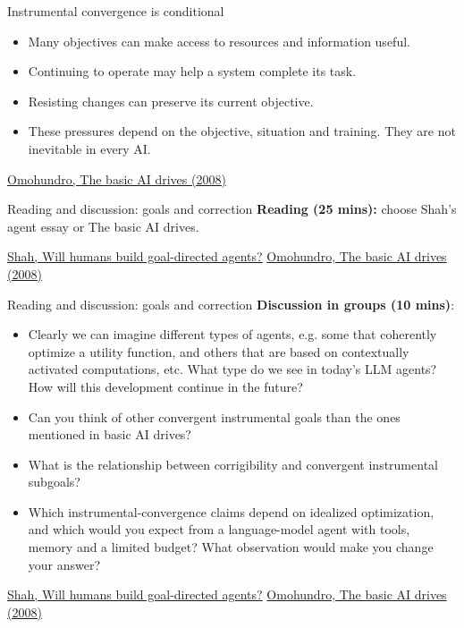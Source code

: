 \documentclass[aspectratio=169,11pt]{beamer}
\newcommand{\sources}[1]{\vfill{\fontsize{6.3}{7.5}\selectfont\color{muted}#1\par}}
\begin{document}
\begin{frame}[t,label=convergence]{Instrumental convergence is conditional}
\begin{itemize}\setlength{\itemsep}{3.5mm}
\item Many objectives can make access to resources and information useful.
\item Continuing to operate may help a system complete its task.
\item Resisting changes can preserve its current objective.
\item These pressures depend on the objective, situation and training. They are not inevitable in every AI.
\end{itemize}
\sources{\href{https://selfawaresystems.com/wp-content/uploads/2008/01/ai_drives_final.pdf}{Omohundro, The basic AI drives (2008)}}
\end{frame}

\begin{frame}[t,label=agencyexercise]{Reading and discussion: goals and correction}
\textbf{Reading (25 mins):} choose Shah's agent essay or The basic AI drives.
\sources{\href{https://www.alignmentforum.org/posts/9zpT9dikrrebdq3Jf/will-humans-build-goal-directed-agents}{Shah, Will humans build goal-directed agents?} \quad \href{https://selfawaresystems.com/wp-content/uploads/2008/01/ai_drives_final.pdf}{Omohundro, The basic AI drives (2008)}}
\end{frame}

\begin{frame}[t,label=agencyexercise]{Reading and discussion: goals and correction}
\textbf{Discussion in groups (10 mins)}:
\begin{itemize}
\item Clearly we can imagine different types of agents, e.g. some that coherently optimize a utility function, and others that are based on contextually activated computations, etc. What type do we see in today’s LLM agents? How will this development continue in the future?  
\item Can you think of other convergent instrumental goals than the ones mentioned in basic AI drives?  
\item What is the relationship between corrigibility and convergent instrumental subgoals?
\item Which instrumental-convergence claims depend on idealized optimization, and which would you expect from a language-model agent with tools, memory and a limited budget? What observation would make you change your answer?
\end{itemize}
\sources{\href{https://www.alignmentforum.org/posts/9zpT9dikrrebdq3Jf/will-humans-build-goal-directed-agents}{Shah, Will humans build goal-directed agents?} \quad \href{https://selfawaresystems.com/wp-content/uploads/2008/01/ai_drives_final.pdf}{Omohundro, The basic AI drives (2008)}}
\end{frame}
\end{document}
